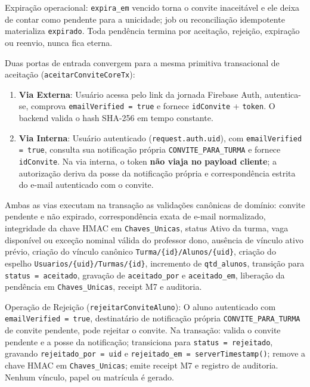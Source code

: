 \begin{regra}
Expiração operacional: \texttt{expira\_em} vencido torna o convite inaceitável
e ele deixa de contar como pendente para a unicidade; job ou reconciliação
idempotente materializa \texttt{expirado}. Toda pendência termina por aceitação,
rejeição, expiração ou reenvio, nunca fica eterna.
\end{regra}

\begin{regra}
Duas portas de entrada convergem para a mesma primitiva transacional de aceitação (\texttt{aceitarConviteCoreTx}):
\begin{enumerate}
  \item \textbf{Via Externa}: Usuário acessa pelo link da jornada Firebase Auth, autentica-se, comprova \texttt{emailVerified = true} e fornece \texttt{idConvite} + \texttt{token}. O backend valida o hash SHA-256 em tempo constante.
  \item \textbf{Via Interna}: Usuário autenticado (\texttt{request.auth.uid}), com \texttt{emailVerified = true}, consulta sua notificação própria \texttt{CONVITE\_PARA\_TURMA} e fornece \texttt{idConvite}. Na via interna, o token \textbf{não viaja no payload cliente}; a autorização deriva da posse da notificação própria e correspondência estrita do e-mail autenticado com o convite.
\end{enumerate}
Ambas as vias executam na transação as validações canônicas de domínio: convite pendente e não expirado, correspondência exata de e-mail normalizado, integridade da chave HMAC em \texttt{Chaves\_Unicas}, status Ativo da turma, vaga disponível ou exceção nominal válida do professor dono, ausência de vínculo ativo prévio, criação do vínculo canônico \texttt{Turma/\{id\}/Alunos/\{uid\}}, criação do espelho \texttt{Usuarios/\{uid\}/Turmas/\{id\}}, incremento de \texttt{qtd\_alunos}, transição para \texttt{status = aceitado}, gravação de \texttt{aceitado\_por} e \texttt{aceitado\_em}, liberação da pendência em \texttt{Chaves\_Unicas}, receipt M7 e auditoria.

Operação de Rejeição (\texttt{rejeitarConviteAluno}):
O aluno autenticado com \texttt{emailVerified = true}, destinatário de notificação própria \texttt{CONVITE\_PARA\_TURMA} de convite pendente, pode rejeitar o convite. Na transação: valida o convite pendente e a posse da notificação; transiciona para \texttt{status = rejeitado}, gravando \texttt{rejeitado\_por = uid} e \texttt{rejeitado\_em = serverTimestamp()}; remove a chave HMAC em \texttt{Chaves\_Unicas}; emite receipt M7 e registro de auditoria. Nenhum vínculo, papel ou matrícula é gerado.


\end{regra}
